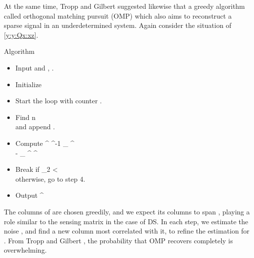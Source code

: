 At the same time, Tropp and Gilbert \cite {TrG07b} suggested likewise that a greedy algorithm called orthogonal matching pursuit (OMP) which also aims to reconstruct a sparse signal in an underdetermined system.
Again consider the situation of \ref {y:y:Qx:xz}.

\Result
{Algorithm}
{
\begin {itemize}
%
\item Input  and , .
%
\item Initialize
%
%
\item Start the loop with counter .
%
\item Find
%
 {
n
\leftarrow {} {}
 \\
}
%
and append .
%
\item Compute
%
 {
 ^\ddagger
\leftarrow {} ^{-1}  _{} ^\dagger \\
%
\leftarrow {} - _{} ^\dagger {} ^\ddagger {} \\
}
%
\item Break if
%
 {
 _2
<\eta \\
}
%
otherwise, go to step 4.
%
\item Output 
%
 {
\leftarrow {} ^\ddagger {} \\
}
\end {itemize}
}
%
The columns of  are chosen greedily, and we expect its columns to span , playing a role similar to the sensing matrix in the case of DS.
In each step, we estimate the noise , and find a new column most correlated with it, to refine the estimation for .
From Tropp and Gilbert \cite {TrG07a}, the probability that OMP recovers  completely is overwhelming.

